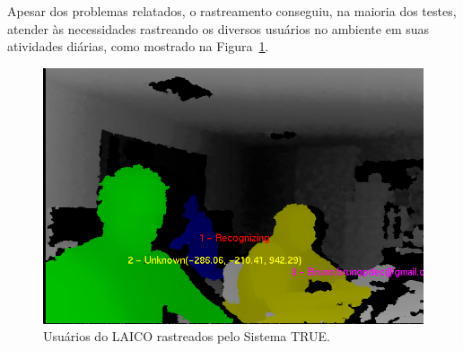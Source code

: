 	Apesar dos problemas relatados, o rastreamento conseguiu, na maioria dos testes,
	atender às necessidades rastreando os diversos usuários no ambiente em suas
	atividades diárias, como mostrado na Figura~\ref{fig:varios-usuarios-ambiente}.

	\begin{figure}[htb]
		\begin{center}
			\includegraphics[scale=0.5]{figuras/5.Testes/oclusao/usuarios-rastreados.png}
		\end{center}
		\caption{Usuários do LAICO rastreados pelo Sistema TRUE.}
		\label{fig:varios-usuarios-ambiente}
	\end{figure}	
